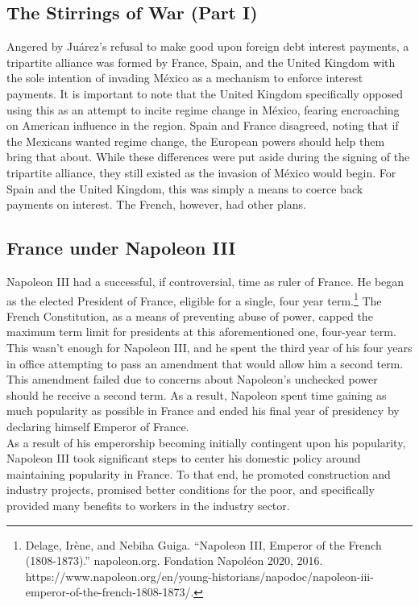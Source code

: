 \documentclass[10pt, letterpaper]{article}
\begin{document}
\subsection{The Stirrings of War (Part I)}

Angered by Juárez's refusal to make good upon foreign debt interest
payments, a tripartite alliance was formed by France, Spain, and the
United Kingdom with the sole intention of invading México as a mechanism
to enforce interest payments. It is important to note that the United
Kingdom specifically opposed using this as an attempt to incite regime
change in México, fearing encroaching on American influence in the
region. Spain and France disagreed, noting that if the Mexicans wanted
regime change, the European powers should help them bring that about.
While these differences were put aside during the signing of the
tripartite alliance, they still existed as the invasion of México would
begin. For Spain and the United Kingdom, this was simply a means to
coerce back payments on interest. The French, however, had other plans. \\

\subsection{France under Napoleon III}

Napoleon III had a successful, if controversial, time as ruler of
France. He began as the elected President of France, eligible for a
single, four year term.\footnote{Delage, Irène, and Nebiha Guiga.
  ``Napoleon III, Emperor of the French (1808-1873).'' napoleon.org.
  Fondation Napoléon 2020, 2016.
  https://www.napoleon.org/en/young-historians/napodoc/napoleon-iii-emperor-of-the-french-1808-1873/.}
The French Constitution, as a means of preventing abuse of power, capped
the maximum term limit for presidents at this aforementioned one,
four-year term. This wasn't enough for Napoleon III, and he spent the
third year of his four years in office attempting to pass an amendment
that would allow him a second term. This amendment failed due to
concerns about Napoleon's unchecked power should he receive a second
term. As a result, Napoleon spent time gaining as much popularity as
possible in France and ended his final year of presidency by declaring
himself Emperor of
France. \\

 As a result of his emperorship becoming initially contingent upon his
popularity, Napoleon III took significant steps to center his domestic
policy around maintaining popularity in France. To that end, he promoted
construction and industry projects, promised better conditions for the
poor, and specifically provided many benefits to workers in the industry
sector. \\
\end{document}

